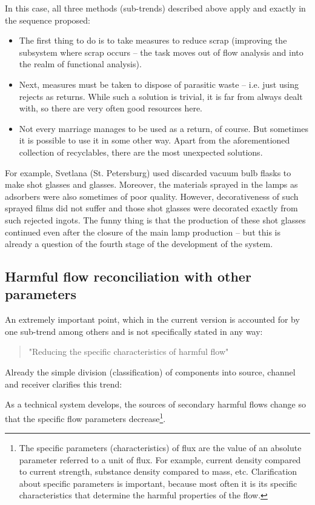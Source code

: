 \documentclass[a4paper,11pt]{article}
\begin{document}
In this case, all three methods (sub-trends) described above apply and exactly
in the sequence proposed:
\begin{itemize}
\item The first thing to do is to take measures to reduce scrap (improving the
  subsystem where scrap occurs -- the task moves out of flow analysis and into
  the realm of functional analysis).
\item Next, measures must be taken to dispose of parasitic waste -- i.e. just
  using rejects as returns. While such a solution is trivial, it is far from
  always dealt with, so there are very often good resources here.
\item Not every marriage manages to be used as a return, of course. But
  sometimes it is possible to use it in some other way. Apart from the
  aforementioned collection of recyclables, there are the most unexpected
  solutions.
\end{itemize}
For example, Svetlana (St. Petersburg) used discarded vacuum bulb flasks to
make shot glasses and glasses. Moreover, the materials sprayed in the lamps as
adsorbers were also sometimes of poor quality. However, decorativeness of such
sprayed films did not suffer and those shot glasses were decorated exactly
from such rejected ingots. The funny thing is that the production of these
shot glasses continued even after the closure of the main lamp production --
but this is already a question of the fourth stage of the development of the
system.

\subsection{Harmful flow reconciliation with other parameters}

An extremely important point, which in the current version is accounted for by
one sub-trend among others and is not specifically stated in any way:
\begin{quote}
  "Reducing the specific characteristics of harmful flow"
\end{quote}
Already the simple division (classification) of components into source,
channel and receiver clarifies this trend:

As a technical system develops, the sources of secondary harmful flows change
so that the specific flow parameters decrease\footnote{The specific parameters
  (characteristics) of flux are the value of an absolute parameter referred to
  a unit of flux. For example, current density compared to current strength,
  substance density compared to mass, etc. Clarification about specific
  parameters is important, because most often it is its specific
  characteristics that determine the harmful properties of the flow.}.
\end{document}
